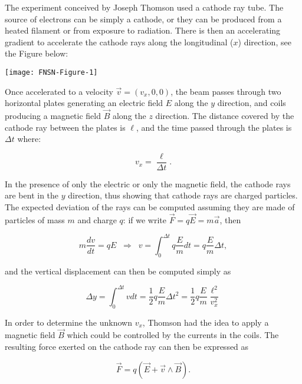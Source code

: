 \begin{framed}
\begin{experiment}
    
    The experiment conceived by Joseph Thomson used a cathode ray tube. The source of electrons can be simply a cathode, or they can be produced from a heated filament or from exposure to radiation. There is then an accelerating gradient to accelerate the cathode rays along the longitudinal ($x$) direction, see the Figure below:
    
        \texttt{[image: FNSN-Figure-1]}

Once accelerated to a velocity $\vec{v} = (v_x, 0, 0)$, the beam passes through two horizontal plates generating an electric field $E$ along the $y$ direction, and coils producing a magnetic field $\vec{B}$ along the $z$ direction. The distance covered by the cathode ray between the plates is $\ell$, and the time passed through the plates is $\Delta t$ where:

$$ v_x = \frac{\ell}{\Delta t}.$$

In the presence of only the electric or only the magnetic field, the cathode rays are bent in the $y$ direction, thus showing that cathode rays are charged particles. The expected deviation of the rays can be computed assuming they are made of particles of mass $m$ and charge $q$: if we write $\vec{F} = q \vec{E} = m \vec{a}$, then

\begin{equation*} m \frac{dv}{dt} = q E \; \; \Rightarrow \; \; v = \int_0^{\Delta t} q \frac{E}{m} dt = q\frac{E}{m}\Delta t,\end{equation*}

and the vertical displacement can then be computed simply as

\begin{equation*}\Delta y = \int_0^{\Delta t} v dt  = \frac{1}{2}  q\frac{E}{m} \Delta t^2 = \frac{1}{2} q \frac{E}{m} \frac{\ell^2}{v_x^2} \end{equation*}

In order to determine the unknown $v_x$,  Thomson had the idea to apply a magnetic field $\vec{B}$ which could be controlled by the currents in the coils. The resulting force exerted on the cathode ray can then be expressed as

\begin{equation*}\vec{F} = q (\vec{E} + \vec{v} \wedge \vec{B}).\end{equation*}


\end{experiment}
\end{framed}
